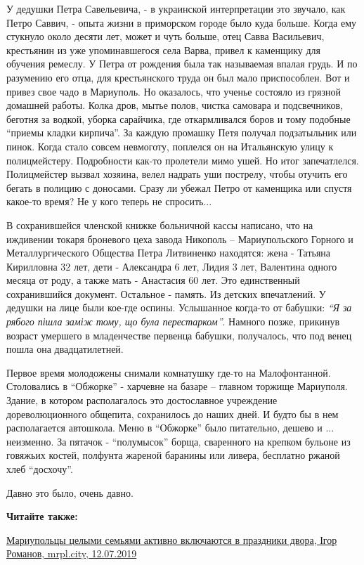 У дедушки Петра Савельевича, - в украинской интерпретации это звучало, как
Петро Саввич, - опыта жизни в приморском городе было куда больше. Когда ему
стукнуло около десяти лет, может и чуть больше, отец Савва Васильевич,
крестьянин из уже упоминавшегося села Варва, привел к каменщику для обучения
ремеслу. У Петра от рождения была так называемая впалая грудь. И по разумению
его отца, для крестьянского труда он был мало приспособлен. Вот и привез свое
чадо в Мариуполь. Но оказалось, что ученье состояло из грязной домашней работы.
Колка дров, мытье полов, чистка самовара и подсвечников, беготня за водкой,
уборка сарайчика, где откармливался боров и тому подобные \enquote{приемы кладки
кирпича}. За каждую промашку Петя получал подзатыльник или пинок. Когда стало
совсем невмоготу, поплелся он на Итальянскую улицу к полицмейстеру.
Подробности как-то пролетели мимо ушей. Но итог запечатлелся. Полицмейстер
вызвал хозяина, велел надрать уши пострелу, чтобы отучить его бегать в полицию
с доносами. Сразу ли убежал Петро от каменщика или спустя какое-то время? Не у
кого теперь не спросить...

В сохранившейся членской книжке больничной кассы написано, что на иждивении
токаря броневого цеха завода Никополь – Мариупольского Горного и
Металлургического Общества Петра Литвиненко находятся: жена - Татьяна
Кирилловна 32 лет, дети - Александра 6 лет, Лидия 3 лет, Валентина одного
месяца от роду, а также мать - Анастасия 60 лет. Это единственный сохранившийся
документ. Остальное  - память. Из детских впечатлений. У дедушки на лице были
кое-где оспины. Услышанное когда-то от бабушки: \emph{\enquote{Я за рябого пішла заміж тому,
що була перестарком}}. Намного позже, прикинув возраст умершего в младенчестве
первенца бабушки, получалось, что под венец пошла она двадцатилетней.

Первое время молодожены снимали комнатушку где-то на Малофонтанной. Столовались
в \enquote{Обжорке} - харчевне на базаре – главном торжище Мариуполя. Здание, в котором
располагалось это достославное учреждение дореволюционного общепита,
сохранилось до наших дней. И будто бы в нем располагается автошкола. Меню в
\enquote{Обжорке} было питательно, дешево и ... неизменно. За пятачок - \enquote{полумысок}
борща, сваренного на крепком бульоне из говяжьих костей, полфунта жареной
баранины или ливера, бесплатно ржаной хлеб \enquote{досхочу}.

Давно это было, очень давно.

\textbf{Читайте также:} 

\href{https://mrpl.city/news/view/mariupoltsy-tselymi-semyami-aktivno-vklyuchayutsya-v-prazdniki-dvora-foto}{%
Мариупольцы целыми семьями активно включаются в праздники двора, Ігор Романов, mrpl.city, 12.07.2019}

\clearpage
